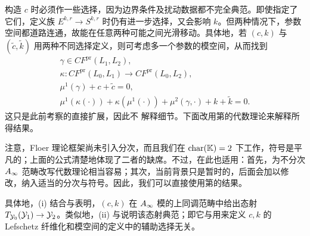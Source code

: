 构造 $c$ 时必须作一些选择，因为边界条件及扰动数据都不完全典范。即使指定了它们，定义族 $E^{k,r}\to S^{k,r}$ 时仍有进一步选择，又会影响 $k$。但两种情况下，参数空间都道路连通，故能在任意两种可能之间光滑移动。具体地，若 $(c,k)$ 与 $(\tilde c,\tilde k)$ 用两种不同选择定义，则可考虑多一个参数的模空间，从而找到
\begin{equation}\label{eq:17.14}
\boxed{\begin{gathered}
\gamma\in CF^{\mathrm{pr}}(L_1,L_2),\\
\kappa:CF^{\mathrm{pr}}(L_0,L_1)\longrightarrow CF^{\mathrm{pr}}(L_0,L_2),\\
\mu^1(\gamma)+c+\tilde c=0,\\
\mu^1(\kappa(\cdot))+\kappa(\mu^1(\cdot))+\mu^2(\gamma,\cdot)+k+\tilde k=0.
\end{gathered}}
\end{equation}
这只是此前考察的直接扩展，因此不
解释细节。下面改用第的代数理论来解释所得结果。

\begin{note}\label{st:17.10}
注意，Floer 理论框架尚未引入分次，而且我们在 $\operatorname{char}(\mathbb K)=2$ 下工作，符号是平凡的；上面的公式清楚地体现了二者的缺席。不过，在此也适用：首先，为不分次 $A_\infty$ 范畴改写代数理论相当容易；其次，当前背景只是暂时的，后面会加以修改，纳入适当的分次与符号。因此，我们可以直接使用第的结果。
\end{note}

具体地，(i) 结合与表明，$(c,k)$ 在 $A_\infty$ 模的上同调范畴中给出态射 $T_{\mathcal Y_0}(\mathcal Y_1)\to\mathcal Y_2$。类似地，(ii) 与说明该态射典范；即它与用来定义 $c,k$ 的 Lefschetz 纤维化和模空间的定义中的辅助选择无关。
